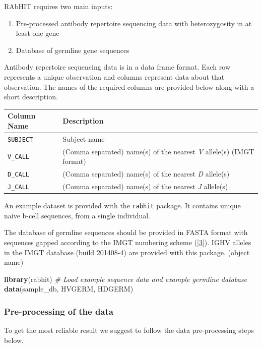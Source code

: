 \documentclass[11pt,]{article}
\newenvironment{Shaded}{}{}
\newcommand{\KeywordTok}[1]{\textcolor[rgb]{0.00,0.44,0.13}{\textbf{#1}}}
\newcommand{\CommentTok}[1]{\textcolor[rgb]{0.38,0.63,0.69}{\textit{#1}}}
\newcommand{\NormalTok}[1]{#1}
\providecommand{\tightlist}{%
  \setlength{\itemsep}{0pt}\setlength{\parskip}{0pt}}
\begin{document}
RAbHIT requires two main inputs:

\begin{enumerate}
\def\labelenumi{\arabic{enumi}.}
\tightlist
\item
  Pre-processed antibody repertoire sequencing data with heterozygosity
  in at least one gene
\item
  Database of germline gene sequences
\end{enumerate}

Antibody repertoire sequencing data is in a data frame format. Each row
represents a unique observation and columns represent data about that
observation. The names of the required columns are provided below along
with a short description.

\begin{longtable}[]{@{}ll@{}}
\toprule
Column Name & Description\tabularnewline
\midrule
\endhead
\texttt{SUBJECT} & Subject name\tabularnewline
\texttt{V\_CALL} & (Comma separated) name(s) of the nearest \emph{V}
allele(s) (IMGT format)\tabularnewline
\texttt{D\_CALL} & (Comma separated) name(s) of the nearest \emph{D}
allele(s)\tabularnewline
\texttt{J\_CALL} & (Comma separated) name(s) of the nearest \emph{J}
allele(s)\tabularnewline
\bottomrule
\end{longtable}

An example dataset is provided with the \texttt{rabhit} package. It
contains unique naive b-cell sequences, from a single individual.

The database of germline sequences should be provided in FASTA format
with sequences gapped according to the IMGT numbering scheme
(\href{http://www.ncbi.nlm.nih.gov/pubmed/12477501}{{[}3{]}}). IGHV
alleles in the IMGT database (build 201408-4) are provided with this
package. (object name)

\begin{Shaded}
\begin{Highlighting}[]
\KeywordTok{library}\NormalTok{(rabhit)}
\CommentTok{# Load example sequence data and example germline database}
\KeywordTok{data}\NormalTok{(sample_db, HVGERM, HDGERM)}
\end{Highlighting}
\end{Shaded}

\subsubsection{Pre-processing of the
data}\label{pre-processing-of-the-data}

To get the most reliable result we suggest to follow the data
pre-processing steps below.
\end{document}
